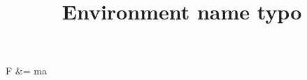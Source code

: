 \documentclass{handout}
\title{Environment name typo}
\begin{document}
\maketitle
\begin{allign}
  F &= ma
\end{allign}
\end{document}
